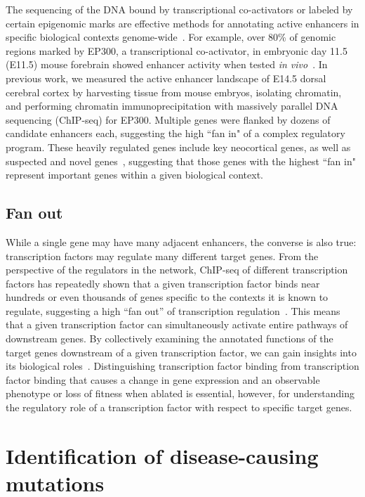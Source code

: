 The sequencing of the DNA bound by transcriptional co-activators or labeled by certain epigenomic marks are effective methods for annotating active enhancers in specific biological contexts genome-wide~\citep{Visel:2009jp,Ernst:2011kw}. For example, over 80\% of genomic regions marked by EP300, a transcriptional co-activator, in embryonic day 11.5 (E11.5) mouse forebrain showed enhancer activity when tested \emph{in vivo}~\citep{Visel:2009jp}. In previous work, we measured the active enhancer landscape of E14.5 dorsal cerebral cortex by harvesting tissue from mouse embryos, isolating chromatin, and performing chromatin immunoprecipitation with massively parallel DNA sequencing (ChIP-seq) for EP300. Multiple genes were flanked by dozens of candidate enhancers each, suggesting the high ``fan in" of a complex regulatory program. These heavily regulated genes include key neocortical genes, as well as suspected and novel genes~\citep{Wenger:2013jd}, suggesting that those genes with the highest ``fan in" represent important genes within a given biological context.

\subsection{Fan out}

While a single gene may have many adjacent enhancers, the converse is also true: transcription factors may regulate many different target genes. From the perspective of the regulators in the network, ChIP-seq of different transcription factors has repeatedly shown that a given transcription factor binds near hundreds or even thousands of genes specific to the contexts it is known to regulate, suggesting a high “fan out” of transcription regulation~\citep{McLean:2010iq}. This means that a given transcription factor can simultaneously activate entire pathways of downstream genes. By collectively examining the annotated functions of the target genes downstream of a given transcription factor, we can gain insights into its biological roles~\citep{McLean:2010iq, Wenger:2013ds}. Distinguishing transcription factor binding from transcription factor binding that causes a change in gene expression and an observable phenotype or loss of fitness when ablated is essential, however, for understanding the regulatory role of a transcription factor with respect to specific target genes.

\section{Identification of disease-causing mutations}

